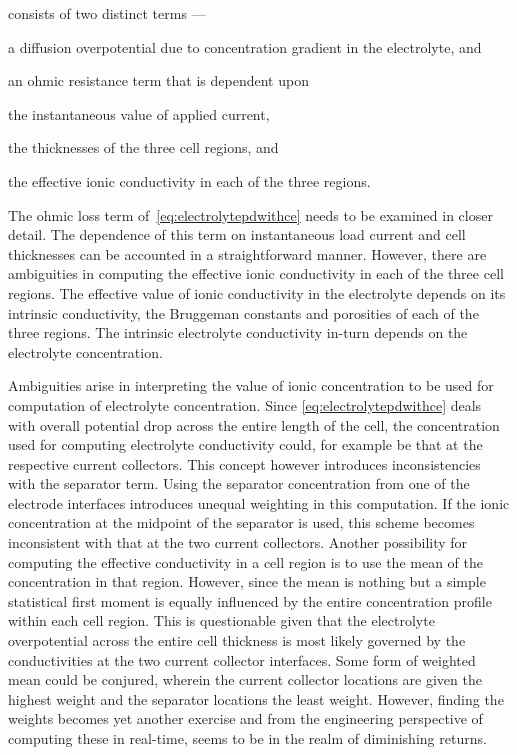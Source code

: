  consists of two distinct terms ---
\begin{enumerate*}[label=\roman*)]
    \item a diffusion overpotential due to concentration gradient in the electrolyte, and
    \item an ohmic resistance term that is dependent upon
        \begin{enumerate*}[label=\itshape\alph*\upshape)]
            \item the instantaneous value of applied current,
            \item the thicknesses of the three cell regions, and
            \item the effective ionic conductivity in each of the three regions. %
        \end{enumerate*}
\end{enumerate*}

The ohmic  loss term  of~\cref{eq:electrolytepdwithce} needs  to be  examined in
closer detail.  The dependence of  this term  on instantaneous load  current and
cell thicknesses  can be accounted  in a straightforward manner.  However, there
are ambiguities  in computing the  effective ionic  conductivity in each  of the
three cell regions. The effective value of ionic conductivity in the electrolyte
depends on its intrinsic conductivity, the Bruggeman constants and porosities of
each  of  the three  regions.  The  intrinsic electrolyte  conductivity  in-turn
depends on the electrolyte concentration.

Ambiguities   arise   in  interpreting   the   value   of  ionic   concentration
to   be    used   for   computation   of    electrolyte   concentration.   Since
\cref{eq:electrolytepdwithce}  deals  with  overall potential  drop  across  the
entire  length of  the cell,  the concentration  used for  computing electrolyte
conductivity could,  for example be  that at the respective  current collectors.
This concept however  introduces inconsistencies with the  separator term. Using
the  separator concentration  from one  of the  electrode interfaces  introduces
unequal  weighting  in this  computation.  If  the  ionic concentration  at  the
midpoint of the separator is used, this scheme becomes inconsistent with that at
the  two current  collectors. Another  possibility for  computing the  effective
conductivity in a  cell region is to  use the mean of the  concentration in that
region. However, since the mean is nothing but a simple statistical first moment
is  equally influenced  by the  entire  concentration profile  within each  cell
region. This is questionable given that the electrolyte overpotential across the
entire cell thickness  is most likely governed by the  conductivities at the two
current  collector interfaces.  Some form  of weighted  mean could  be conjured,
wherein the  current collector locations  are given  the highest weight  and the
separator locations the  least weight. However, finding the  weights becomes yet
another  exercise and  from the  engineering perspective  of computing  these in
real-time, seems to be in the realm of diminishing returns.

